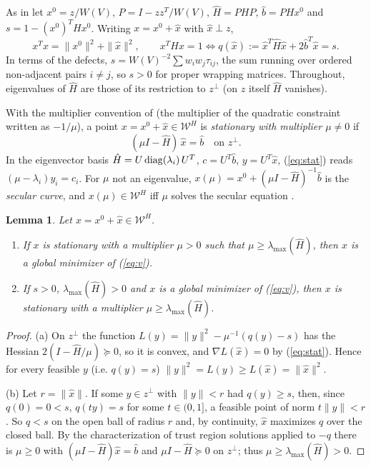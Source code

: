 \documentclass[11pt]{article}
\newtheorem{lem}[thm]{Lemma}
\theoremstyle{definition}
\theoremstyle{remark}
\newcommand{\Wc}{\mathcal{W}}
\newcommand{\hH}{\hat{H}}
\newcommand{\hb}{\hat{b}}
\newcommand{\hx}{\hat{x}}
\newcommand{\lmax}{\lambda_{\max}}
\begin{document}
As in \cite[Section~5]{CW} let $x^0=z/W(V)$, $P=I-zz^T/W(V)$, $\hH=PHP$,
$\hb=PHx^0$ and $s=1-(x^0)^THx^0$. Writing $x=x^0+\hx$ with $\hx\perp z$,
\[ x^Tx=\|x^0\|^2+\|\hx\|^2, \qquad
   x^THx=1 \iff q(\hx):=\hx^T\hH\hx+2\hb^T\hx=s. \]
In terms of the defects,
$s = W(V)^{-2}\sum w_iw_j\tau_{ij}$, the sum running over ordered
non-adjacent pairs $i\neq j$, so $s>0$ for proper wrapping matrices.
Throughout, eigenvalues of $\hH$ are those of its restriction to
$z^\perp$ (on $z$ itself $\hH$ vanishes).

With the multiplier convention of \cite{CW} (the multiplier of the
quadratic constraint written as $-1/\mu$), a point $x=x^0+\hx\in\Wc^H$ is
{\em stationary with multiplier $\mu\neq 0$} if
\begin{equation}
\label{eq:stat}
(\mu I-\hH)\,\hx=\hb \quad\mbox{on } z^\perp.
\end{equation}
In the eigenvector basis $\hH=U\,{\rm diag}(\lambda_i)\,U^T$, $c=U^T\hb$,
$y=U^T\hx$, (\ref{eq:stat}) reads $(\mu-\lambda_i)y_i=c_i$. For $\mu$ not
an eigenvalue, $x(\mu)=x^0+(\mu I-\hH)^{-1}\hb$ is the {\em secular curve},
and $x(\mu)\in\Wc^H$ iff $\mu$ solves the secular equation
\cite[(19)]{CW}.

\begin{lem}
\label{lem:global}
Let $x=x^0+\hx\in\Wc^H$.
\begin{enumerate}
\item[(a)] If $x$ is stationary with a multiplier $\mu>0$ such that
$\mu\geq\lmax(\hH)$, then $x$ is a global minimizer of (\ref{eq:v}).
\item[(b)] If $s>0$, $\lmax(\hH)>0$ and $x$ is a global minimizer of
(\ref{eq:v}), then $x$ is stationary with a multiplier
$\mu\geq\lmax(\hH)$.
\end{enumerate}
\end{lem}
\begin{proof}
(a) On $z^\perp$ the function $L(y)=\|y\|^2-\mu^{-1}(q(y)-s)$ has the
Hessian $2(I-\hH/\mu)\succeq 0$, so it is convex, and $\nabla L(\hx)=0$ by
(\ref{eq:stat}). Hence for every feasible $y$ (i.e. $q(y)=s$)
$\|y\|^2=L(y)\geq L(\hx)=\|\hx\|^2$.

(b) Let $r=\|\hx\|$. If some $y\in z^\perp$ with $\|y\|<r$ had
$q(y)\geq s$, then, since $q(0)=0<s$, $q(ty)=s$ for some $t\in(0,1]$, a
feasible point of norm $t\|y\|<r$. So $q<s$ on the open ball of radius $r$
and, by continuity, $\hx$ maximizes $q$ over the closed ball. By the
characterization of trust region solutions \cite{MS83} applied to $-q$
there is $\mu\geq0$ with $(\mu I-\hH)\hx=\hb$ and $\mu I-\hH\succeq 0$ on
$z^\perp$; thus $\mu\geq\lmax(\hH)>0$.
\end{proof}
\end{document}
